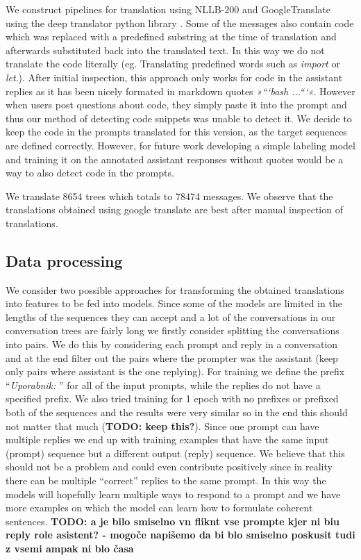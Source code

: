 \documentclass[fleqn,moreauthors,10pt]{ds_report}
\begin{document}
    We construct pipelines for translation using NLLB-200 \cite{nllb2022} and GoogleTranslate \cite{google-translate} using the deep translator python library \cite{deep_transaltor}.
    Some of the messages also contain code which was replaced with a predefined substring at the time of translation and afterwards substituted back into the translated text.
    In this way we do not translate the code literally (eg. Translating predefined words such as \textit{import} or \textit{let}.). After initial inspection, this approach only works for code in the assistant replies as it has been nicely formated in markdown quotes  \textit{»```bash ...```«}. However when users post questions about code, they simply paste it into the prompt and thus our method of detecting code snippets was unable to detect it. 
    We decide to keep the code in the prompts translated for this version, as the target sequences are defined correctly. However, for future work developing a simple labeling model and training it on the annotated assistant responses without quotes would be a way to also detect code in the prompts.
    
    We translate 8654 trees which totals to 78474 messages.
    We observe that the translations obtained using google translate are best after manual inspection of translations.


    \subsection*{Data processing}
    
    We consider two possible approaches for transforming the obtained translations into features to be fed into models.
    Since some of the models are limited in the lengths of the sequences they can accept and a lot of the conversations in our conversation trees are fairly long we firstly consider splitting the conversations into pairs.
    We do this by considering each prompt and reply in a conversation and at the end filter out the pairs where the prompter was the assistant (keep only pairs where assistant is the one replying).
    For training we define the prefix ``\textit{Uporabnik: }'' for all of the input prompts, while the replies do not have a specified prefix.
    We also tried training for 1 epoch with no prefixes or prefixed both of the sequences and the results were very similar so in the end this should not matter that much (\textbf{TODO: keep this?}).
    Since one prompt can have multiple replies we end up with training examples that have the same input (prompt) sequence but a different output (reply) sequence.
    We believe that this should not be a problem and could even contribute positively since in reality there can be multiple ``correct'' replies to the same prompt.
    In this way the models will hopefully learn multiple ways to respond to a prompt and we have more examples on which the model can learn how to formulate coherent sentences.
    \textbf{TODO: a je bilo smiselno vn fliknt vse prompte kjer ni biu reply role asistent? - mogoče napišemo da bi blo smiselno poskusit tudi z vsemi ampak ni blo časa}
    
\end{document}
